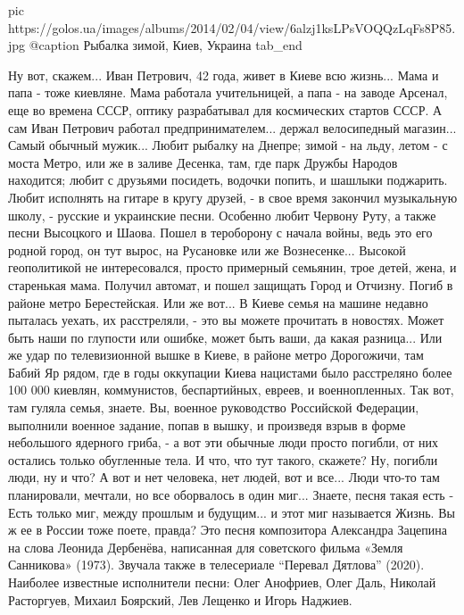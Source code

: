 		 pic https://golos.ua/images/albums/2014/02/04/view/6alzj1ksLPsVOQQzLqFs8P85.jpg
		 @caption Рыбалка зимой, Киев, Украина
  tab_end
\fi

Ну вот, скажем...  Иван Петрович, 42 года, живет в Киеве всю жизнь... Мама и
папа - тоже киевляне.  Мама работала учительницей, а папа - на заводе Арсенал,
еще во времена СССР, оптику разрабатывал для космических стартов СССР.  А сам
Иван Петрович работал предпринимателем... держал велосипедный магазин... Самый
обычный мужик...  Любит рыбалку на Днепре; зимой - на льду, летом - с моста
Метро, или же в заливе Десенка, там, где парк Дружбы Народов находится; любит с
друзьями посидеть, водочки попить, и шашлыки поджарить.  Любит исполнять на
гитаре в кругу друзей, - в свое время закончил музыкальную школу, - русские и
украинские песни.  Особенно любит Червону Руту, а также песни Высоцкого и
Шаова.  Пошел в тероборону с начала войны, ведь это его родной город, он тут
вырос, на Русановке или же Вознесенке... Высокой геополитикой не интересовался,
просто примерный семьянин, трое детей, жена, и старенькая мама.  Получил
автомат, и пошел защищать Город и Отчизну. Погиб в районе метро Берестейская.
Или же вот... В Киеве семья на машине недавно пыталась уехать, их расстреляли,
- это вы можете прочитать в новостях. Может быть наши по глупости или ошибке,
может быть ваши, да какая разница... Или же удар по телевизионной вышке в
Киеве, в районе метро Дорогожичи, там Бабий Яр рядом, где в годы оккупации
Киева нацистами было расстреляно более 100 000 киевлян, коммунистов,
беспартийных, евреев, и военнопленных. Так вот, там гуляла семья, знаете. Вы,
военное руководство Российской Федерации, выполнили военное задание, попав в
вышку, и произведя взрыв в форме небольшого ядерного гриба, - а вот эти обычные
люди просто погибли, от них остались только обугленные тела.  И что, что тут
такого, скажете? Ну, погибли люди, ну и что? А вот и нет человека, нет людей,
вот и все... Люди что-то там планировали, мечтали, но все оборвалось в один
миг...  Знаете, песня такая есть - Есть только миг, между прошлым и будущим...
и этот миг называется Жизнь. Вы ж ее в России тоже поете, правда?  Это песня
композитора Александра Зацепина на слова Леонида Дербенёва, написанная для
советского фильма «Земля Санникова» (1973).  Звучала также в телесериале
\enquote{Перевал Дятлова} (2020). Наиболее известные исполнители песни: Олег
Анофриев, Олег Даль, Николай Расторгуев, Михаил Боярский, Лев Лещенко и Игорь
Наджиев.

